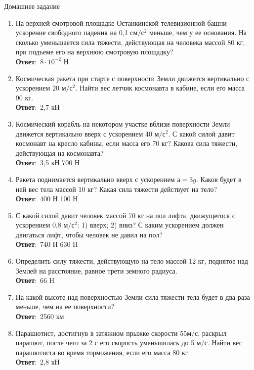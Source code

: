 \documentclass[a6paper, 11pt]{diss_4}
\renewcommand{\'}{\,'}
\begin{document}
\begin{center}
   Домашнее задание
\end{center}
\begin{enumerate}

\item На верхней смотровой площадке Останкинской телевизионной башни ускорение свободного падения на 0,1 $см/с^2$ меньше, чем у ее основания. На сколько уменьшается сила тяжести, действующая на человека массой 80 кг, при подъеме его на верхнюю смотровую площадку?
\\\textbf{Ответ}:\ $8\cdot10^{-2}$ Н

\item Космическая ракета при старте с поверхности Земли движется вертикально с ускорением 20 $м/с^2$. Найти вес летчик космонавта в кабине, если его масса 90 кг.
\\\textbf{Ответ}:\ 2,7 кН

\item Космический корабль на некотором участке вблизи поверхности Земли движется вертикально вверх с ускорением 40 $м/с^2$. С какой силой давит космонавт на кресло кабины, если масса его 70 кг? Какова сила тяжести, действующая на космонавта?
\\\textbf{Ответ}:\ 3,5 кН   700 Н

\item Ракета поднимается вертикально вверх с ускорением $а = 3g$. Каков будет в ней вес тела массой 10 кг? Какая сила тяжести действует на тело?
\\\textbf{Ответ}:\ 400 Н    100 Н

\item С какой силой давит человек массой 70 кг на пол лифта, движущегося с ускорением 0,8 $м/с^2$: 1) вверх; 2) вниз? С каким ускорением должен двигаться лифт, чтобы человек не давил на пол?
\\\textbf{Ответ}:\ 740 Н    630 Н

\item Определить силу тяжести, действующую на тело массой 12 кг, поднятое над Землей на расстояние, равное трети земного радиуса.
\\\textbf{Ответ}:\ 66 Н

\item На какой высоте над поверхностью Земли сила тяжести тела будет в два раза меньше, чем на ее поверхности?
\\\textbf{Ответ}:\ 2560 км

\item Парашютист, достигнув в затяжном прыжке скорости $55 м/с$, раскрыл парашют, после чего за 2 с его скорость уменьшилась до 5 м/с. Найти вес парашютиста во время торможения, если его масса 80 кг.
\\\textbf{Ответ}:\ 2,8 кН
\end{enumerate}
\end{document}
